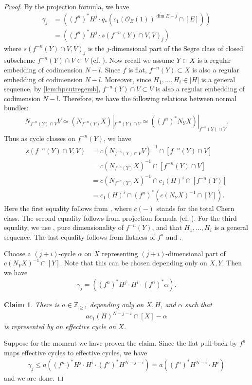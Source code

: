 \documentclass[12pt]{amsart}
\theoremstyle{plain}
\newtheorem{claim}[theorem]{Claim}
\theoremstyle{definition}
\numberwithin{equation}{section}
\def\Z{{\mathbb Z}}
\def\O{{ \mathcal{O}}}
\def\a{{ \mathfrak{a}}}
\renewcommand{\a}{\alpha}
\newcommand{\g}{\gamma}
\begin{document}
\begin{proof}
By the projection formula, we have
\begin{align}
\g_{j} & = ((f^{n})^{*}H^{j} \cdot q_{*} ( c_{1}(\O_{E}(1))^{\dim E - j} \cap [E] ))\\
& = ((f^{n})^{*}H^{j} \cdot  s(f^{-n}(Y)\cap V, V)_{j})
\end{align}
where $s(f^{-n}(Y)\cap V, V)_{j}$ is the $j$-dimensional part of the Segre class of closed subscheme $f^{-n}(Y) \cap V \subset V$
(cf. \cite[Corollary 4.2.2]{fulintersec}).
Now recall we assume $Y \subset X$ is a regular embedding of codimension $N - l$.
Since $f$ is flat, $f^{-n}(Y) \subset X$ is also a regular embedding of codimension $N - l$.
Moreover, since $H_{1}, \dots, H_{i} \in |H|$ is a general sequence, by \cref{lem:hpcutregemb},
$f^{-n}(Y) \cap V \subset V$ is also a regular embedding of codimension $N-l$. 
Therefore, we have the following relations between normal bundles:
\begin{align}
N_{f^{-n}(Y)\cap V} V \simeq (N_{f^{-n}(Y)}X )|_{f^{-n}(Y) \cap V} \simeq ((f^{n})^{*}N_{Y}X)|_{f^{-n}(Y) \cap V}.
\end{align}
Thus as cycle classes on $f^{-n}(Y)$, we have
\begin{align}
s(f^{-n}(Y) \cap V, V) &= c(N_{f^{-n}(Y)\cap V} V )^{-1} \cap [f^{-n}(Y) \cap V]\\
& = c(N_{f^{-n}(Y)}X)^{-1} \cap [f^{-n}(Y) \cap V] \\
& = c(N_{f^{-n}(Y)}X)^{-1} \cap c_{1}(H)^{i} \cap [f^{-n}(Y)]\\
& = c_{1}(H)^{i} \cap (f^{n})^{*}(c(N_{Y}X)^{-1} \cap [Y]).
\end{align}
Here the first equality follows from \cite[Proposition 4.1(a)]{fulintersec}, 
where $c(-)$ stands for the total Chern class.
The second equality follows from projection formula (cf. \cite[Theorem 3.2(c)]{fulintersec}).
For the third equality, 
we use \cite[Lemma 1.7.2]{fulintersec}, 
pure dimensionality of $f^{-n}(Y)$, and that $H_{1}, \dots , H_{i}$ is a general sequence.
The last equality follows from flatness of $f^{n}$ and \cite[Theorem 3.2 (d)]{fulintersec}.

Choose a $(j+i)$-cycle $\a$ on $X$ representing $(j+i)$-dimensional part of $c(N_{Y}X)^{-1} \cap [Y]$.
Note that this can be chosen depending only on $X, Y$.
Then we have
\begin{align}
\g_{j} = ((f^{n})^{*}H^{j} \cdot H^{i} \cdot (f^{n})^{*} \a).
\end{align}

\begin{claim}\label{claim:boundingbyci}
There is $a \in \Z_{\geq 1}$ depending only on $X, H$, and $\a$ such that
\begin{align}
a c_{1}(H)^{N-j-i} \cap [X] - \a
\end{align}
is represented by an effective cycle on $X$.
\end{claim}
Suppose for the moment we have proven the claim.
Since the flat pull-back by $f^{n}$ maps effective cycles to effective cycles, we have
\begin{align}
\g_{j} \leq a ((f^{n})^{*}H^{j} \cdot H^{i} \cdot  (f^{n})^{*}H^{N-j-i} ) = a ((f^{n})^{*}H^{N-i} \cdot H^{i})
\end{align}
and we are done.



\end{proof}
\end{document}
